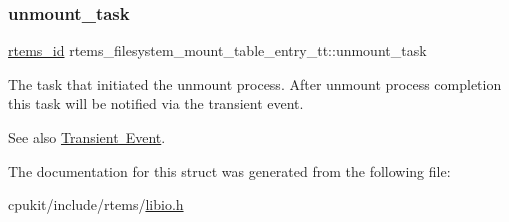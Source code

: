 \subsubsection{\texorpdfstring{unmount\_task}{unmount\_task}}
{\footnotesize\ttfamily \mbox{\hyperlink{group__ClassicTasks_gab20892b814dced7dd4e5b9bf42becd57}{rtems\+\_\+id}} rtems\+\_\+filesystem\+\_\+mount\+\_\+table\+\_\+entry\+\_\+tt\+::unmount\+\_\+task}

The task that initiated the unmount process. After unmount process completion this task will be notified via the transient event.

\begin{DoxySeeAlso}{See also}
\mbox{\hyperlink{group__ClassicEventTransient}{Transient Event}}. 
\end{DoxySeeAlso}


The documentation for this struct was generated from the following file\+:\begin{DoxyCompactItemize}
\item 
cpukit/include/rtems/\mbox{\hyperlink{libio_8h}{libio.\+h}}\end{DoxyCompactItemize}
